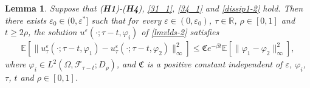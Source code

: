 \documentclass[11pt]{article}
\numberwithin{equation}{section}
\theoremstyle{plain}
\newtheorem{lemma}{Lemma}[section]
\begin{document}
\begin{lemma}\label{sdsec}
 Suppose that ({\bf H1})-({\bf H4}), \eqref{31_1}, \eqref{34_1}  and \eqref{dissip1-2} hold.
 Then there exists $\varepsilon_0 \in (0, \varepsilon^*]$ such that for every 
  $\varepsilon \in (0, \varepsilon_0)$, 
  $\tau \in \mathbb{R}$,
 $\rho \in [0,1]$ 
 and $t \ge 2\rho$, 
 the solution $u^{\varepsilon} (\cdot; \tau-t, \varphi_i)$ of \eqref{lmvlds-2} satisfies
 \begin{align*}
       \mathbb{E} 
    	             \left[ \| u^\varepsilon_\tau(\cdot; \tau -t, \varphi_1) 
    	                         - u^\varepsilon_\tau(\cdot; \tau -t, \varphi_2)  
    	                      \|_{\infty}^2
    	             \right] 
   \le \mathfrak{C}
                 e^{ - \beta t} 
    	              \mathbb{E}
    	                     \left[ \| \varphi_1 - \varphi_2 \|_\infty^2
    	                     \right],
 \end{align*}
 where $\varphi_i \in L^2(\Omega, \mathcal{F}_{\tau-t}; D_\rho )$,
 and $\mathfrak{C}$ is a positive constant independent of $\varepsilon$, $\varphi_i$, $\tau$, $t$ and $\rho \in [0,1]$.
\end{lemma}
\end{document}
